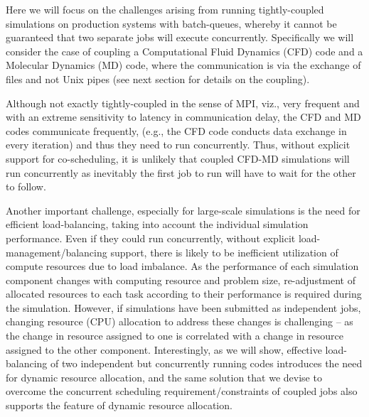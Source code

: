 \documentclass[conference,final]{IEEEtran}
\newcommand{\jhanote}[1]{ {\textcolor{red} { ***Jha: #1 }}}
\newcommand{\jhanote}[1]{}
\begin{document}
Here we will focus on the challenges arising from running
tightly-coupled simulations on production systems with batch-queues,
whereby it cannot be guaranteed that two separate jobs will execute
concurrently. Specifically we will consider the case of coupling a
Computational Fluid Dynamics (CFD) code and a Molecular Dynamics (MD)
code, where the communication is via the exchange of files and not
Unix pipes (see next section for details on the coupling).


Although not exactly tightly-coupled in the sense of MPI, viz., very
frequent and with an extreme sensitivity to latency in communication
delay, the CFD and MD codes communicate frequently, (e.g., the CFD
code conducts data exchange in every iteration) and thus they need to
run concurrently. Thus, without explicit support for co-scheduling, it
is unlikely that coupled CFD-MD simulations will run concurrently as
inevitably the first job to run will have to wait for the other to
follow.


Another important challenge, especially for large-scale simulations is
the need for efficient load-balancing, taking into account the
individual simulation performance. Even if they could run
concurrently, without explicit load-management/balancing support,
there is likely to be inefficient utilization of compute resources due
to load imbalance. As the performance of each simulation component
changes with computing resource and problem size, re-adjustment of
allocated resources to each task according to their performance is
required during the simulation. However, if simulations have been
submitted as independent jobs, changing resource (CPU) allocation to
address these changes is challenging -- as the change in resource
assigned to one is correlated with a change in resource assigned to
the other component. Interestingly, as we will show, effective
load-balancing of two independent but concurrently running codes
introduces the need for dynamic resource allocation, and the same
solution that we devise to overcome the concurrent scheduling
requirement/constraints of coupled jobs also supports the feature of
dynamic resource allocation.
\end{document}
